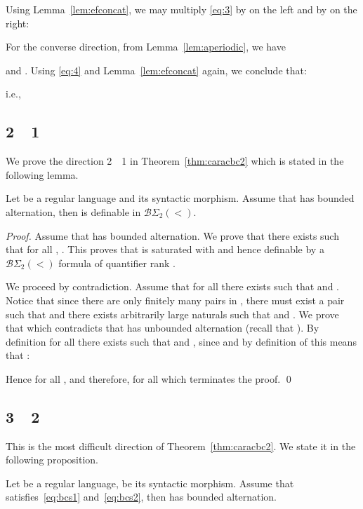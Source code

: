 \documentclass[envcountsame]{llncs}
\newcommand{\bsw}[1]{\ensuremath{\mathcal{B}\Sigma_{#1}(<)}\xspace}
\newcommand{\bswd}{\ensuremath{\mathcal{B}\Sigma_{2}(<)}\xspace}
\begin{document}
Using Lemma~\ref{lem:efconcat}, we may multiply \eqref{eq:3} by
 on the left and by  on the right:

For the converse direction, from Lemma~\ref{lem:aperiodic}, we have 

and . Using   \eqref{eq:4} and Lemma~\ref{lem:efconcat} again, we
conclude that:

i.e.,


\subsection{2~~1}

We prove the direction 2~~1 in Theorem~\ref{thm:caracbc2}
which is stated in the following lemma. 

\begin{lemma} \label{lem:bcinter}
  Let  be a regular language and  its syntactic
  morphism. Assume that  has bounded alternation, then
   is definable in \bswd.
\end{lemma}

\begin{proof}
  Assume that  has bounded alternation. We prove that
  there exists  such that for all , . This proves that 
  is saturated with  and hence definable by a \bsw{2} formula
  of quantifier rank .

  We proceed by contradiction. Assume that for all  there
  exists  such that  and
  . Notice that since there are only
  finitely many pairs in , there must exist a pair 
  such that  and there exists arbitrarily large naturals 
  such that  and . We prove that
   which contradicts that
   has unbounded alternation (recall that ). By definition for all  there exists 
  such that  and , since  and by definition of  this means that :
  
  Hence for all ,  and therefore,
  for all    which terminates the proof.
  \qed
\end{proof}

\subsection{3~~2}

This is the most difficult direction of Theorem~\ref{thm:caracbc2}. We
state it in the following proposition.

\begin{proposition} \label{prop:bcsuff}
  Let  be a regular language,  be its
  syntactic morphism. Assume that  satisfies~\eqref{eq:bcs1}
  and~\eqref{eq:bcs2}, then  has bounded alternation.
\end{proposition}
\end{document}
